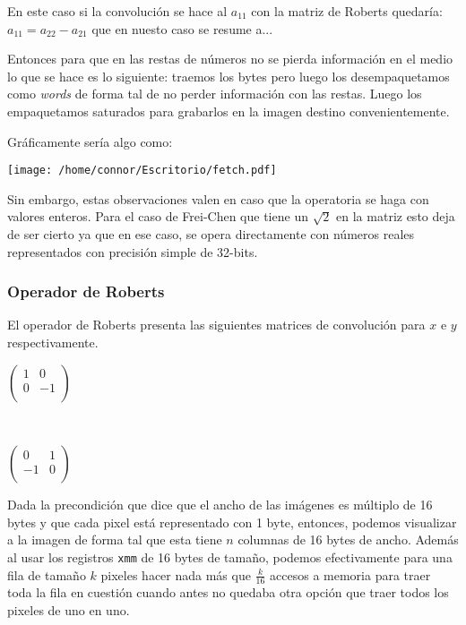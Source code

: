 En este caso si la convolución se hace al $a_{11}$ con la matriz de Roberts quedaría: $a_{11} = a_{22} - a_{21}$ que en nuesto caso se resume a...

Entonces para que en las restas de números no se pierda información en el medio lo que se hace es lo siguiente: traemos los bytes pero luego los desempaquetamos como \emph{words} de forma tal de no perder información con las restas. Luego los empaquetamos saturados para grabarlos en la imagen destino convenientemente. 

\pagebreak
Gráficamente sería algo como: 

\texttt{[image: /home/connor/Escritorio/fetch.pdf]}

Sin embargo, estas observaciones valen en caso que la operatoria se haga con valores enteros. Para el caso de Frei-Chen que tiene un $\sqrt{2}$ en la matriz esto deja de ser cierto ya que en ese caso, se opera directamente con números reales representados con precisión simple de 32-bits.

\subsubsection{Operador de Roberts}

El operador de Roberts presenta las siguientes matrices de convolución para $x$ e $y$ respectivamente.



\begin{center}
\begin{minipage}{0.30 \textwidth}
$\begin{pmatrix}
1 & 0 \\
0 & -1  \\
\end{pmatrix}$
\end{minipage}
\ \ 
 \begin{minipage}{0.30 \textwidth}
$\begin{pmatrix}
0 & 1 \\
-1 & 0 \\
\end{pmatrix}$
\end{minipage}
\end{center}

Dada la precondición que dice que el ancho de las imágenes es múltiplo de 16 bytes y que cada pixel está representado con 1 byte, entonces, podemos visualizar a la imagen de forma tal que esta tiene $n$ columnas de 16 bytes de ancho. Además al usar los registros \texttt{xmm} de 16 bytes de tamaño, podemos efectivamente para una fila de tamaño $k$ pixeles hacer nada más que $\frac{k}{16}$ accesos a memoria para traer toda la fila en cuestión cuando antes no quedaba otra opción que traer todos los pixeles de uno en uno. 

